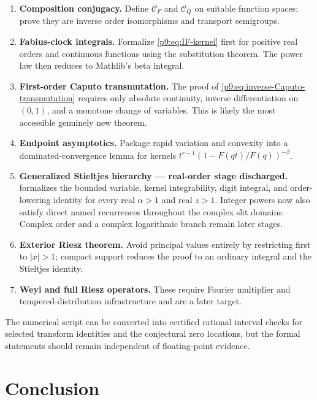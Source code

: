 \documentclass[11pt,oneside]{article}
\theoremstyle{definition}
\theoremstyle{remark}
\newcommand{\1}{\mathbf 1}
\begin{document}
\begin{enumerate}
\item \textbf{Composition conjugacy.}  Define $\mathcal C_F$ and
      $\mathcal C_Q$ on suitable function spaces; prove they are inverse
      order isomorphisms and transport semigroups.
\item \textbf{Fabius-clock integrals.}  Formalize
      \cref{p9:eq:IF-kernel} first for positive real orders and continuous
      functions using the substitution theorem.  The power law then reduces
      to Mathlib's beta integral.
\item \textbf{First-order Caputo transmutation.}  The proof of
      \cref{p9:eq:inverse-Caputo-transmutation} requires only absolute
      continuity, inverse differentiation on $(0,1)$, and a monotone change of
      variables.  This is likely the most accessible genuinely new theorem.
\item \textbf{Endpoint asymptotics.}  Package rapid variation and convexity
      into a dominated-convergence lemma for kernels
      $t^{r-1}(1-F(qt)/F(q))^{-\beta}$.
\item \textbf{Generalized Stieltjes hierarchy --- real-order stage discharged.}
       formalizes the bounded variable, kernel
      integrability, digit integral, and order-lowering identity for every real
      \(\alpha>1\) and real \(z>1\).  Integer powers now also satisfy direct named
      recurrences throughout the complex slit domains.  Complex order and a complex
      logarithmic branch remain later stages.
\item \textbf{Exterior Riesz theorem.}  Avoid principal values entirely by
      restricting first to $|x|>1$; compact support reduces the proof to an
      ordinary integral and the Stieltjes identity.
\item \textbf{Weyl and full Riesz operators.}  These require Fourier
      multiplier and tempered-distribution infrastructure and are a later
      target.
\end{enumerate}

The numerical script can be converted into certified rational interval checks
for selected transform identities and the conjectural zero locations, but the
formal statements should remain independent of floating-point evidence.

\section{Conclusion}
\end{document}
